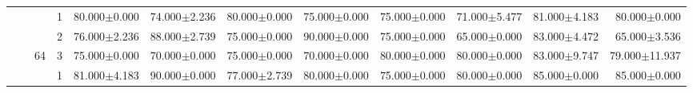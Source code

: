 \begin{table}[htpb]
{\begin{tabular}{c|c|c|c|rr|rr|rr|rr}
                                 &                                                                                 &                                                                                        & 1                                                                                         & 80.000$\pm$0.000                        & 74.000$\pm$2.236                        & 80.000$\pm$0.000                        & 75.000$\pm$0.000                        & 75.000$\pm$0.000                         & 71.000$\pm$5.477                         & 81.000$\pm$4.183                        & 80.000$\pm$0.000                       \\
                                 &                                                                                 &                                                                                        & 2                                                                                         & 76.000$\pm$2.236                        & 88.000$\pm$2.739                        & 75.000$\pm$0.000                        & 90.000$\pm$0.000                        & 75.000$\pm$0.000                         & 65.000$\pm$0.000                         & 83.000$\pm$4.472                        & 65.000$\pm$3.536                       \\
                                 &                                                                                 & \multirow{-3}{*}{64}                                                                   & 3                                                                                         & 75.000$\pm$0.000                        & 70.000$\pm$0.000                        & 75.000$\pm$0.000                        & 70.000$\pm$0.000                        & 80.000$\pm$0.000                         & 80.000$\pm$0.000                         & 83.000$\pm$9.747                        & 79.000$\pm$11.937                      \\ \cline{3-12} 
                                 &                                                                                 &                                                                                        & 1                                                                                         & 81.000$\pm$4.183                        & 90.000$\pm$0.000                        & 77.000$\pm$2.739                        & 80.000$\pm$0.000                        & 75.000$\pm$0.000                         & 80.000$\pm$0.000                         & 85.000$\pm$0.000                        & 85.000$\pm$0.000                       \\

\end{tabular}}
\end{table}
